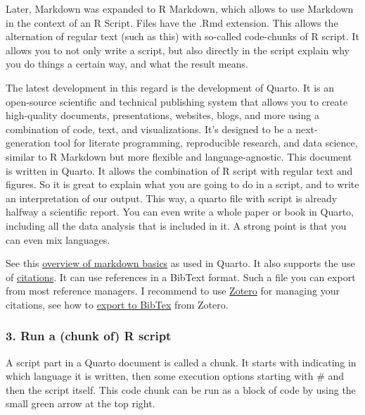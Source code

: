 \documentclass[
  letterpaper,
  DIV=11,
  numbers=noendperiod]{scrartcl}
\begin{document}
Later, Markdown was expanded to R Markdown, which allows to use Markdown
in the context of an R Script. Files have the .Rmd extension. This
allows the alternation of regular text (such as this) with so-called
code-chunks of R script. It allows you to not only write a script, but
also directly in the script explain why you do things a certain way, and
what the result means.

The latest development in this regard is the development of Quarto. It
is an open-source scientific and technical publishing system that allows
you to create high-quality documents, presentations, websites, blogs,
and more using a combination of code, text, and visualizations. It's
designed to be a next-generation tool for literate programming,
reproducible research, and data science, similar to R Markdown but more
flexible and language-agnostic. This document is written in Quarto. It
allows the combination of R script with regular text and figures. So it
is great to explain what you are going to do in a script, and to write
an interpretation of our output. This way, a quarto file with script is
already halfway a scientific report. You can even write a whole paper or
book in Quarto, including all the data analysis that is included in it.
A strong point is that you can even mix languages.

See this
\href{https://quarto.org/docs/authoring/markdown-basics.html}{overview
of markdown basics} as used in Quarto. It also supports the use of
\href{https://quarto.org/docs/authoring/citations.html}{citations}. It
can use references in a BibText format. Such a file you can export from
most reference managers. I recommend to use
\href{https://www.zotero.org/}{Zotero} for managing your citations, see
how to
\href{https://libguides.rhul.ac.uk/referencing/Zoterolatex}{export to
BibTex} from Zotero.

\subsubsection{3. Run a (chunk of) R
script}\label{run-a-chunk-of-r-script}

A script part in a Quarto document is called a chunk. It starts with
indicating in which language it is written, then some execution options
starting with \#\textbar{} and then the script itself. This code chunk
can be run as a block of code by using the small green arrow at the top
right.
\end{document}
